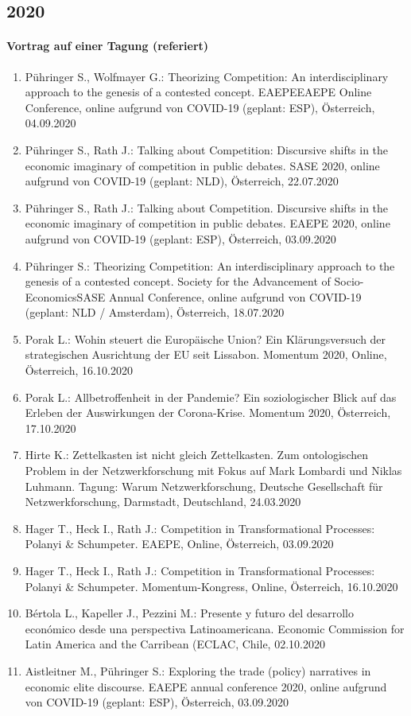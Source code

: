 \subsection*{2020}
\paragraph{Vortrag auf einer Tagung (referiert)}
\begin{enumerate}
	\item Pühringer S., Wolfmayer G.: Theorizing Competition: An interdisciplinary approach to the genesis of a contested concept. EAEPEEAEPE Online Conference, online aufgrund von COVID-19 (geplant: ESP), Österreich, 04.09.2020
	\item Pühringer S., Rath J.: Talking about Competition: Discursive shifts in the economic imaginary of competition in public debates. SASE 2020, online aufgrund von COVID-19 (geplant: NLD), Österreich, 22.07.2020
	\item Pühringer S., Rath J.: Talking about Competition. Discursive shifts in the economic imaginary of competition in public debates. EAEPE 2020, online aufgrund von COVID-19 (geplant: ESP), Österreich, 03.09.2020
	\item Pühringer S.: Theorizing Competition: An interdisciplinary approach to the genesis of a contested concept. Society for the Advancement of Socio-EconomicsSASE Annual Conference, online aufgrund von COVID-19 (geplant: NLD / Amsterdam), Österreich, 18.07.2020
	\item Porak L.: Wohin steuert die Europäische Union? Ein Klärungsversuch der strategischen Ausrichtung der EU seit Lissabon. Momentum 2020, Online, Österreich, 16.10.2020
	\item Porak L.: Allbetroffenheit in der Pandemie? Ein soziologischer Blick auf das Erleben der Auswirkungen der Corona-Krise. Momentum 2020, Österreich, 17.10.2020
	\item Hirte K.: Zettelkasten ist nicht gleich Zettelkasten. Zum ontologischen Problem in der Netzwerkforschung mit Fokus auf Mark Lombardi und Niklas Luhmann. Tagung: Warum Netzwerkforschung, Deutsche Gesellschaft für Netzwerkforschung, Darmstadt, Deutschland, 24.03.2020
	\item Hager T., Heck I., Rath J.: Competition in Transformational Processes: Polanyi & Schumpeter. EAEPE, Online, Österreich, 03.09.2020
	\item Hager T., Heck I., Rath J.: Competition in Transformational Processes: Polanyi & Schumpeter. Momentum-Kongress, Online, Österreich, 16.10.2020
	\item Bértola L., Kapeller J., Pezzini M.: Presente y futuro del desarrollo económico desde una perspectiva Latinoamericana. Economic Commission for Latin America and the Carribean (ECLAC, Chile, 02.10.2020
	\item Aistleitner M., Pühringer S.: Exploring the trade (policy) narratives in economic elite discourse. EAEPE annual conference 2020, online aufgrund von COVID-19 (geplant: ESP), Österreich, 03.09.2020
\end{enumerate}
